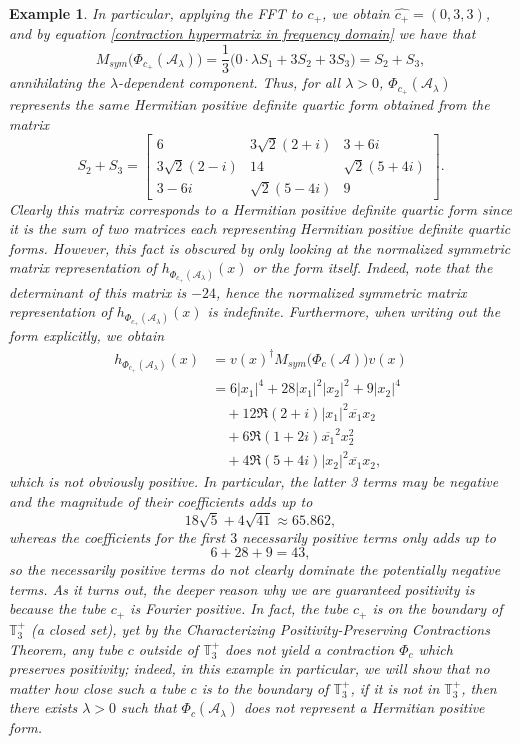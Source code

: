 \documentclass[11pt]{article}
\newtheorem{example}[theorem]{Example}
\begin{document}
\begin{example}
    In particular, applying the FFT to $c_+$, we obtain $\widehat{c_+} = (0,3,3)$, and by equation \eqref{contraction hypermatrix in frequency domain} we have that 
    \[M_{sym}\big(\Phi_{c_+}(\mathcal{A}_{\lambda})\big) = \frac{1}{3}\big(0\cdot\lambda S_1 + 3S_2 + 3S_3\big) = S_2+S_3,\]
    annihilating the $\lambda$-dependent component. Thus, for all $\lambda > 0$, $\Phi_{c_+}(\mathcal{A}_{\lambda})$ represents the same Hermitian positive definite quartic form obtained from the matrix 
    \[S_2 + S_3 = \left[\begin{array}{ccc}
        6 & 3\sqrt{2}(2+i) & 3+6i \\
        3\sqrt{2}(2-i) & 14 & \sqrt{2}(5+4i) \\
        3-6i & \sqrt{2}(5-4i) & 9
    \end{array}\right].\]
    Clearly this matrix corresponds to a Hermitian positive definite quartic form since it is the sum of two matrices each representing Hermitian positive definite quartic forms. However, this fact is obscured by only looking at the normalized symmetric matrix representation of $h_{\Phi_{c_+}(\mathcal{A}_{\lambda})}(x)$ or the form itself. Indeed, note that the determinant of this matrix is $-24$, hence the normalized symmetric matrix representation of $h_{\Phi_{c_+}(\mathcal{A}_{\lambda})}(x)$ is indefinite. Furthermore, when writing out the form explicitly, we obtain 
    \begin{align*}
        h_{\Phi_{c_+}(\mathcal{A}_{\lambda})}(x) &= v(x)^{\dagger}M_{sym}\big(\Phi_c(\mathcal{A})\big)v(x) \\
        &= 6|x_1|^4+28|x_1|^2|x_2|^2+9|x_2|^4 \\
        &\quad + 12\Re{(2+i)|x_1|^2\overline{x_1}x_2} \\
        &\quad + 6\Re{(1+2i)\overline{x_1}^2x_2^2} \\
        &\quad + 4\Re{(5+4i)|x_2|^2\overline{x_1}x_2},
    \end{align*}
    which is not obviously positive. In particular, the latter 3 terms may be negative and the magnitude of their coefficients adds up to 
    \[18\sqrt{5}+4\sqrt{41}\approx 65.862,\]
    whereas the coefficients for the first $3$ necessarily positive terms only adds up to 
    \[6+28+9 = 43,\]
    so the necessarily positive terms do not clearly dominate the potentially negative terms. As it turns out, the deeper reason why we are guaranteed positivity is because the tube $c_+$ is Fourier positive. In fact, the tube $c_+$ is on the boundary of $\mathbb{T}_3^+$ (a closed set), yet by the Characterizing Positivity-Preserving Contractions Theorem, any tube $c$ outside of $\mathbb{T}_3^+$ does not yield a contraction $\Phi_c$ which preserves positivity; indeed, in this example in particular, we will show that no matter how close such a tube $c$ is to the boundary of $\mathbb{T}_3^+$, if it is not in $\mathbb{T}_3^+$, then there exists $\lambda > 0$ such that $\Phi_c(\mathcal{A}_{\lambda})$ does not represent a Hermitian positive form. 
    

\end{example}
\end{document}
